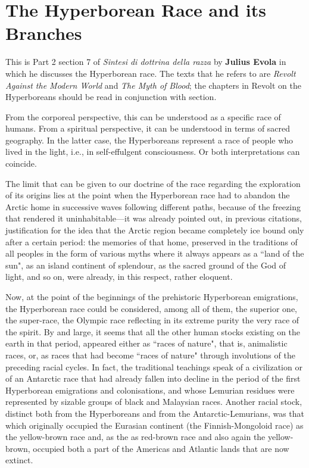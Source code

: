 \section{The Hyperborean Race and its Branches}

\begin{quotex}
This is Part 2 section 7 of \emph{Sintesi di dottrina della razza} by \textbf{Julius Evola} in which he discusses the Hyperborean race. The texts that he refers to are \emph{Revolt Against the Modern World} and \emph{The Myth of Blood}; the chapters in Revolt on the Hyperboreans should be read in conjunction with section.

From the corporeal perspective, this can be understood as a specific race of humans. From a spiritual perspective, it can be understood in terms of sacred geography. In the latter case, the Hyperboreans represent a race of people who lived in the light, i.e., in self-effulgent consciousness. Or both interpretations can coincide. 

\end{quotex}
The limit that can be given to our doctrine of the race regarding the exploration of its origins lies at the point when the Hyperborean race had to abandon the Arctic home in successive waves following different paths, because of the freezing that rendered it uninhabitable—it was already pointed out, in previous citations, justification for the idea that the Arctic region became completely ice bound only after a certain period: the memories of that home, preserved in the traditions of all peoples in the form of various myths where it always appears as a ``land of the sun", as an island continent of splendour, as the sacred ground of the God of light, and so on, were already, in this respect, rather eloquent.

Now, at the point of the beginnings of the prehistoric Hyperborean emigrations, the Hyperborean race could be considered, among all of them, the superior one, the super-race, the Olympic race reflecting in its extreme purity the very race of the spirit. By and large, it seems that all the other human stocks existing on the earth in that period, appeared either as ``races of nature", that is, animalistic races, or, as races that had become ``races of nature" through involutions of the preceding racial cycles. In fact, the traditional teachings speak of a civilization or of an Antarctic race that had already fallen into decline in the period of the first Hyperborean emigrations and colonisations, and whose Lemurian residues were represented by sizable groups of black and Malaysian races. Another racial stock, distinct both from the Hyperboreans and from the Antarctic-Lemurians, was that which originally occupied the Eurasian continent (the Finnish-Mongoloid race) as the yellow-brown race and, as the as red-brown race and also again the yellow-brown, occupied both a part of the Americas and Atlantic lands that are now extinct.


